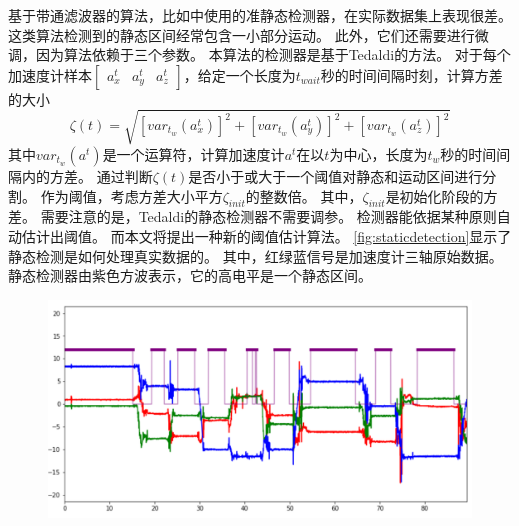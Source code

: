 \documentclass[
  type=master
]{gdutthesis}
\begin{document}
基于带通滤波器的算法，比如\parencite{fong2008methods}中使用的准静态检测器，在实际数据集上表现很差。
这类算法检测到的静态区间经常包含一小部分运动。
此外，它们还需要进行微调，因为算法依赖于三个参数。
本算法的检测器是基于Tedaldi的方法\cite{tedaldi2014robust}。
对于每个加速度计样本$\begin{bmatrix}
	a^t_x & a^t_y & a^t_z
\end{bmatrix}$，给定一个长度为$t_{wait}$秒的时间间隔时刻，计算方差的大小
\begin{equation}\label{eq:var}
	\zeta(t)=\sqrt{[var_{t_w}(a^t_x)]^2+[var_{t_w}(a^t_y)]^2+[var_{t_w}(a^t_z)]^2}
\end{equation}
其中$var_{t_w}(a^t)$是一个运算符，计算加速度计$a^t$在以$t$为中心，长度为$t_w$秒的时间间隔内的方差。
通过判断$\zeta(t)$是否小于或大于一个阈值对静态和运动区间进行分割。
作为阈值，考虑方差大小平方$\zeta_{init}$的整数倍。
其中，$\zeta_{init}$是初始化阶段的方差。
需要注意的是，Tedaldi的静态检测器不需要调参。
检测器能依据某种原则自动估计出阈值。
而本文将提出一种新的阈值估计算法。
\autoref{fig:staticdetection}显示了静态检测是如何处理真实数据的。
其中，红绿蓝信号是加速度计三轴原始数据。
静态检测器由紫色方波表示，它的高电平是一个静态区间。
\begin{figure}[H]
	\centering
	\includegraphics[width=1.0\textwidth]{屏幕截图 2022-05-07 003714.png}
	\label{fig:staticdetection}
\end{figure}
\end{document}

